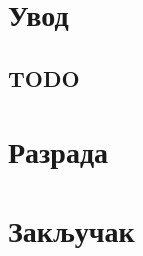 \documentclass[12pt,oneside]{memoir}
\begin{document}
\frontmatter
\naslovna
\komisija
\apstrakt
\tableofcontents*

\mainmatter

\chapter{Увод}

\section{TODO}



\chapter{Разрада}
\label{chp:razrada}


\chapter{Закључак}


\literatura

\backmatter
\end{document}
